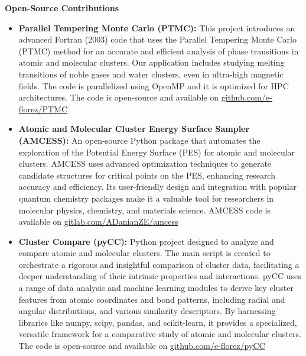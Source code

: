 {\bf\Large Open-Source \textcolor{my_blue}{Contributions}}\\ \vspace*{-6mm}

\begin{itemize}
    \small
    \item \textbf{Parallel Tempering Monte Carlo (PTMC):}
          This project introduces an advanced Fortran (2003) code that uses the Parallel Tempering Monte Carlo (PTMC) method for an accurate and efficient analysis of phase transitions in atomic and molecular clusters. Our application includes studying melting transitions of noble gases and water clusters, even in ultra-high magnetic fields. The code is parallelized using OpenMP and it is optimized for HPC architectures. The code is open-source and available on \href{https://github.com/e-florez/PTMC}{github.com/e-florez/PTMC}

    \item \textbf{Atomic and Molecular Cluster Energy Surface Sampler (AMCESS):}
          An open-source Python package that automates the exploration of the Potential Energy Surface (PES) for atomic and molecular clusters. AMCESS uses advanced optimization techniques to generate candidate structures for critical points on the PES, enhancing research accuracy and efficiency. Its user-friendly design and integration with popular quantum chemistry packages make it a valuable tool for researchers in molecular physics, chemistry, and materials science. AMCESS code is available on \href{https://gitlab.com/ADanianZE/amcess}{gitlab.com/ADanianZE/amcess}

    \item \textbf{Cluster Compare (pyCC):}
          Python project designed to analyze and compare atomic and molecular clusters. The main script is created to orchestrate a rigorous and insightful comparison of cluster data, facilitating a deeper understanding of their intrinsic properties and interactions. pyCC uses a range of data analysis and machine learning modules to derive key cluster features from atomic coordinates and bond patterns, including radial and angular distributions, and various similarity descriptors. By harnessing libraries like numpy, scipy, pandas, and scikit-learn, it provides a specialized, versatile framework for a comparative study of atomic and molecular clusters. The code is open-source and available on \href{https://github.com/e-florez/pyCC}{github.com/e-florez/pyCC}

\end{itemize}